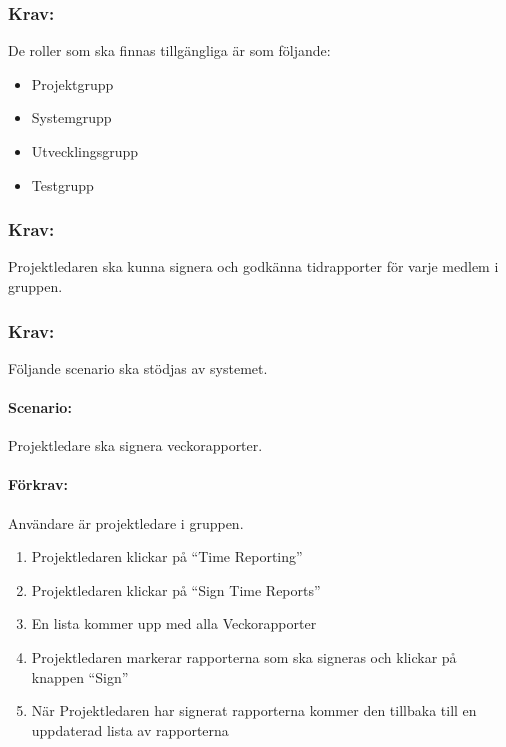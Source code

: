 \documentclass[paper=a4, fontsize=11pt,twoside]{article}
\begin{document}
\paragraph{}
\subsubsection{Krav:}
De roller som ska finnas tillgängliga är som följande:
\begin{itemize}
\item Projektgrupp
\item Systemgrupp
\item Utvecklingsgrupp
\item Testgrupp
\end{itemize}

\paragraph{}
\subsubsection{Krav:}
Projektledaren ska kunna signera och godkänna tidrapporter för varje medlem i gruppen.

\paragraph{}

\subsubsection{Krav:}
Följande scenario ska stödjas av systemet.
\paragraph{Scenario:}
Projektledare ska signera veckorapporter.
\paragraph{Förkrav:}
Användare är projektledare i gruppen.
\begin{enumerate}
\item Projektledaren klickar på “Time Reporting”
\item Projektledaren klickar på “Sign Time Reports”
\item En lista kommer upp med alla Veckorapporter
\item Projektledaren markerar rapporterna som ska signeras och klickar på knappen “Sign”
\item När Projektledaren har signerat rapporterna kommer den tillbaka till en uppdaterad lista av rapporterna
\end{enumerate}
\end{document}

